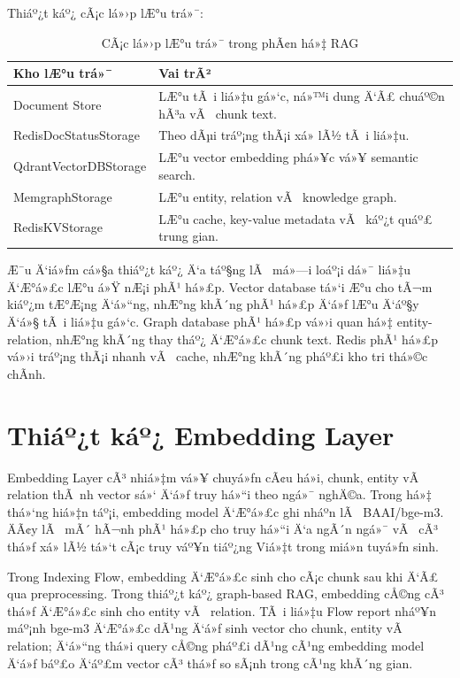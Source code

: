 ﻿\documentclass[12pt,a4paper]{report}
\begin{document}
Thiáº¿t káº¿ cÃ¡c lá»›p lÆ°u trá»¯:

\begin{table}[H]
\centering
\begin{tabular}{|p{4.3cm}|p{8.7cm}|}
\hline
\textbf{Kho lÆ°u trá»¯} & \textbf{Vai trÃ²} \\
\hline
Document Store & LÆ°u tÃ i liá»‡u gá»‘c, ná»™i dung Ä‘Ã£ chuáº©n hÃ³a vÃ  chunk text. \\
\hline
RedisDocStatusStorage & Theo dÃµi tráº¡ng thÃ¡i xá»­ lÃ½ tÃ i liá»‡u. \\
\hline
QdrantVectorDBStorage & LÆ°u vector embedding phá»¥c vá»¥ semantic search. \\
\hline
MemgraphStorage & LÆ°u entity, relation vÃ  knowledge graph. \\
\hline
RedisKVStorage & LÆ°u cache, key-value metadata vÃ  káº¿t quáº£ trung gian. \\
\hline
\end{tabular}
\caption{CÃ¡c lá»›p lÆ°u trá»¯ trong phÃ¢n há»‡ RAG}
\label{tab:rag-storage-layers}
\end{table}

Æ¯u Ä‘iá»ƒm cá»§a thiáº¿t káº¿ Ä‘a táº§ng lÃ  má»—i loáº¡i dá»¯ liá»‡u Ä‘Æ°á»£c lÆ°u á»Ÿ nÆ¡i phÃ¹ há»£p. Vector database tá»‘i Æ°u cho tÃ¬m kiáº¿m tÆ°Æ¡ng Ä‘á»“ng, nhÆ°ng khÃ´ng phÃ¹ há»£p Ä‘á»ƒ lÆ°u Ä‘áº§y Ä‘á»§ tÃ i liá»‡u gá»‘c. Graph database phÃ¹ há»£p vá»›i quan há»‡ entity-relation, nhÆ°ng khÃ´ng thay tháº¿ Ä‘Æ°á»£c chunk text. Redis phÃ¹ há»£p vá»›i tráº¡ng thÃ¡i nhanh vÃ  cache, nhÆ°ng khÃ´ng pháº£i kho tri thá»©c chÃ­nh.

\section{Thiáº¿t káº¿ Embedding Layer}

Embedding Layer cÃ³ nhiá»‡m vá»¥ chuyá»ƒn cÃ¢u há»i, chunk, entity vÃ  relation thÃ nh vector sá»‘ Ä‘á»ƒ truy há»“i theo ngá»¯ nghÄ©a. Trong há»‡ thá»‘ng hiá»‡n táº¡i, embedding model Ä‘Æ°á»£c ghi nháº­n lÃ  BAAI/bge-m3. ÄÃ¢y lÃ  mÃ´ hÃ¬nh phÃ¹ há»£p cho truy há»“i Ä‘a ngÃ´n ngá»¯ vÃ  cÃ³ thá»ƒ xá»­ lÃ½ tá»‘t cÃ¡c truy váº¥n tiáº¿ng Viá»‡t trong miá»n tuyá»ƒn sinh.

Trong Indexing Flow, embedding Ä‘Æ°á»£c sinh cho cÃ¡c chunk sau khi Ä‘Ã£ qua preprocessing. Trong thiáº¿t káº¿ graph-based RAG, embedding cÅ©ng cÃ³ thá»ƒ Ä‘Æ°á»£c sinh cho entity vÃ  relation. TÃ i liá»‡u Flow report nháº¥n máº¡nh bge-m3 Ä‘Æ°á»£c dÃ¹ng Ä‘á»ƒ sinh vector cho chunk, entity vÃ  relation; Ä‘á»“ng thá»i query cÅ©ng pháº£i dÃ¹ng cÃ¹ng embedding model Ä‘á»ƒ báº£o Ä‘áº£m vector cÃ³ thá»ƒ so sÃ¡nh trong cÃ¹ng khÃ´ng gian.
\end{document}
